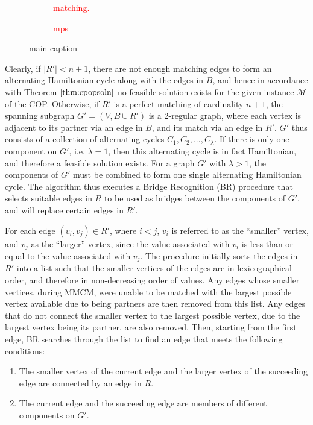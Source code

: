 \documentclass[oribibl]{llncs}
\begin{document}
\begin{figure}	
	\centering
	\begin{subfigure}[h]{0.4\textwidth}
		
		\caption{\textcolor{red}{matching.}}	
		\label{fig:matching}
	\end{subfigure} \quad
	\begin{subfigure}[h]{0.5\textwidth}
		
		\caption{\textcolor{red}{mps}}	
		\label{fig:mps}
	\end{subfigure}
	\caption{main caption}
\end{figure}

Clearly, if $|R'| < n+1$, there are not enough matching edges to form an alternating Hamiltonian cycle along with the edges in $B$, and hence in accordance with Theorem $\ref{thm:cpopsoln}$ no feasible solution exists for the given instance $\mathcal{M}$ of the COP. Otherwise, if $R'$ is a perfect matching of cardinality $n+1$, the spanning subgraph $G'=(V, B \cup R')$ is a 2-regular graph, where each vertex is adjacent to its partner via an edge in $B$, and its match via an edge in $R'$. $G'$ thus consists of a collection of alternating cycles $C_1, C_2, ..., C_{\lambda}$. If there is only one component on $G'$, i.e. $\lambda = 1$, then this alternating cycle is in fact Hamiltonian, and therefore a feasible solution exists. For a graph $G'$ with $\lambda > 1$, the components of $G'$ must be combined to form one single alternating Hamiltonian cycle. The algorithm thus executes a Bridge Recognition (BR) procedure that selects suitable edges in $R$ to be used as bridges between the components of $G'$, and will replace certain edges in $R'$.

For each edge $(v_i, v_j) \in R'$, where $i < j$, $v_i$ is referred to as the ``smaller'' vertex, and $v_j$ as the ``larger'' vertex, since the value associated with $v_i$ is less than or equal to the value associated with $v_j$. The procedure initially sorts the edges in $R'$ into a list such that the smaller vertices of the edges are in lexicographical order, and therefore in non-decreasing order of values. Any edges whose smaller vertices, during MMCM, were unable to be matched with the largest possible vertex available due to being partners are then removed from this list. Any edges that do not connect the smaller vertex to the largest possible vertex, due to the largest vertex being its partner, are also removed. Then, starting from the first edge, BR searches through the list to find an edge that meets the following conditions:
\begin{enumerate}
	\item The smaller vertex of the current edge and the larger vertex of the succeeding edge are connected by an edge in $R$.
	\item The current edge and the succeeding edge are members of different components on $G'$.
\end{enumerate}
\end{document}
